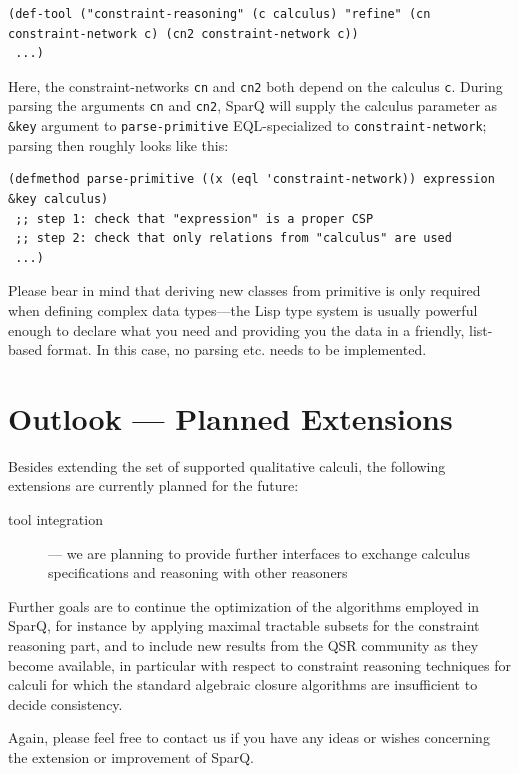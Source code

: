 \documentclass[headsepline]{scrreprt}
\theoremstyle{definition}
\newcommand{\engine}{SparQ}
\begin{document}
\begin{lstlisting}
(def-tool ("constraint-reasoning" (c calculus) "refine" (cn constraint-network c) (cn2 constraint-network c))
 ...)
\end{lstlisting}

Here, the constraint-networks {\tt cn} and {\tt cn2} both depend on the calculus {\tt c}. During parsing the arguments {\tt cn} and {\tt cn2}, \engine{} will supply the calculus parameter {\tt} as {\tt \&key} argument to {\tt parse-primitive} EQL-specialized to {\tt constraint-network}; parsing then roughly looks like this:
\begin{lstlisting}
(defmethod parse-primitive ((x (eql 'constraint-network)) expression &key calculus)
 ;; step 1: check that "expression" is a proper CSP
 ;; step 2: check that only relations from "calculus" are used
 ...)
\end{lstlisting}

Please bear in mind that deriving new classes from primitive is only required when defining complex data types---the Lisp type system is usually powerful enough to declare what you need and providing you the data in a friendly, list-based format. In this case, no parsing etc. needs to be implemented.


\section{Outlook --- Planned Extensions}\label{sec:outlook}

Besides extending the set of supported qualitative calculi,
the following extensions are currently planned for the future:

\begin{description}
\item[tool integration] --- we are planning to provide further interfaces to
exchange calculus specifications and reasoning with other reasoners


\end{description}

Further goals are to continue the optimization of the algorithms employed
in \engine{}, for instance by applying maximal tractable subsets for
the constraint reasoning part, and to include new results from the
QSR community as they become available, in particular with respect to constraint reasoning
techniques for calculi for which the standard algebraic closure
algorithms are insufficient to decide consistency.

Again, please feel free to contact us if you have any ideas or wishes
concerning
the extension or improvement of \engine{}.
\end{document}
